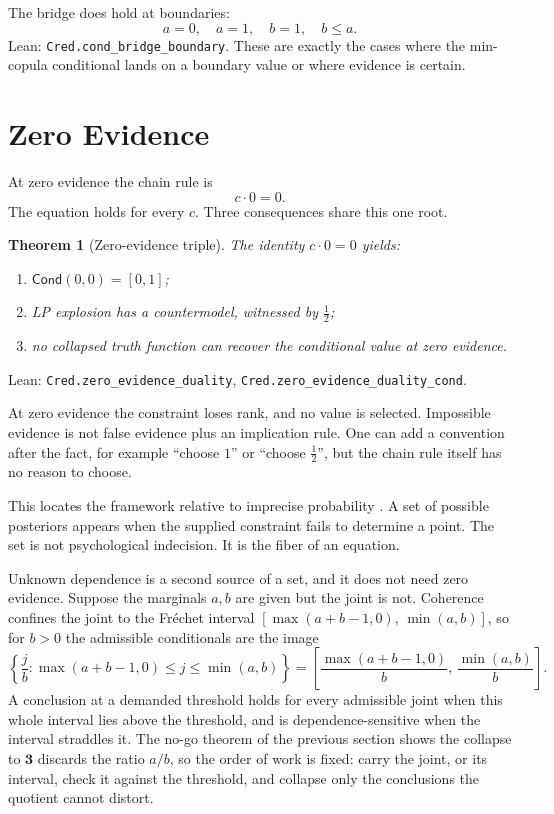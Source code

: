 \documentclass[11pt,a4paper]{article}
\newtheorem{theorem}{Theorem}[section]
\newcommand{\Cond}{\mathsf{Cond}}
\newcommand{\half}{\tfrac12}
\newcommand{\three}{\mathbf{3}}
\newcommand{\Lean}[1]{\texttt{#1}}
\begin{document}
The bridge does hold at boundaries:
\[
  a=0,\quad a=1,\quad b=1,\quad b\le a.
\]
Lean: \Lean{Cred.cond\_bridge\_boundary}.  These are exactly the
cases where the min-copula conditional lands on a boundary value or
where evidence is certain.

\section{Zero Evidence}

At zero evidence the chain rule is
\[
  c\cdot0=0.
\]
The equation holds for every $c$.  Three consequences share this one
root.

\begin{theorem}[Zero-evidence triple]
\label{thm:zero-triple}
The identity $c\cdot0=0$ yields:
\begin{enumerate}[label=(\roman*),nosep]
\item $\Cond(0,0)=[0,1]$;
\item LP explosion has a countermodel, witnessed by $\half$;
\item no collapsed truth function can recover the conditional value at
zero evidence.
\end{enumerate}
\end{theorem}

\noindent
Lean: \Lean{Cred.zero\_evidence\_duality},
\Lean{Cred.zero\_evidence\_duality\_cond}.

At zero evidence the constraint loses rank, and no value is selected.
Impossible evidence is not false evidence plus an implication rule.  One can add a convention after the fact, for example
``choose $1$'' or ``choose $\half$'', but the chain rule itself has no
reason to choose.

This locates the framework relative to imprecise probability
\cite{walley1991,troffaes2014,debock2015,wheeler2021}.  A set of
possible posteriors appears when the supplied constraint fails to
determine a point.  The set is not psychological indecision.  It is the
fiber of an equation.

Unknown dependence is a second source of a set, and it does not need
zero evidence.  Suppose the marginals $a,b$ are given but the joint is
not.  Coherence confines the joint to the Fr\'echet interval
$[\max(a+b-1,0),\,\min(a,b)]$, so for $b>0$ the admissible conditionals
are the image
\[
  \left\{\frac{j}{b}:\max(a+b-1,0)\le j\le\min(a,b)\right\}
  =\left[\frac{\max(a+b-1,0)}{b},\,\frac{\min(a,b)}{b}\right].
\]
A conclusion at a demanded threshold holds for every admissible joint
when this whole interval lies above the threshold, and is
dependence-sensitive when the interval straddles it.  The no-go theorem
of the previous section shows the collapse to $\three$ discards the
ratio $a/b$, so the order of work is fixed: carry the joint, or its
interval, check it against the threshold, and collapse only the
conclusions the quotient cannot distort.
\end{document}
